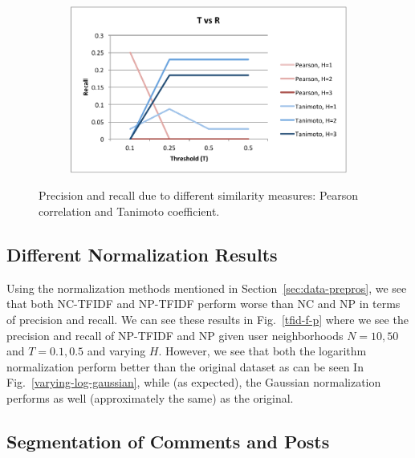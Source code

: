 \documentclass{article}
\begin{document}
\begin{figure}[H!]
\begin{subfigure}{.4\textwidth}
  \label{fig:nvr}
\end{subfigure}%
\begin{subfigure}{.4\textwidth}
  \centering
  \includegraphics[width=\linewidth]{img/tvr.pdf}
  \label{fig:tvr}
\end{subfigure}
\caption{Precision and recall due to different similarity measures: Pearson correlation and
Tanimoto coefficient.}\label{fig:learning-rate-hidden-layers}
\end{figure}

\subsection{Different Normalization Results}\label{sec:different-normalization}

Using the normalization methods mentioned in Section~\ref{sec:data-prepros}, we see that both NC-TFIDF and NP-TFIDF perform worse than NC and NP in terms of precision and recall. We can see these 
results in Fig.~\ref{tfid-f-p} where we see the precision and recall of NP-TFIDF and NP given user neighborhoods
$N =10, 50$ and $T = 0.1, 0.5$ and varying $H$. However, we see that both the logarithm normalization 
perform better than the original dataset as can be seen In Fig.~\ref{varying-log-gaussian}, while (as expected), 
the Gaussian normalization performs as well (approximately the same) as the original. 
 
\subsection{Segmentation of Comments and Posts}\label{sec:set-com-posts}
\end{document}
